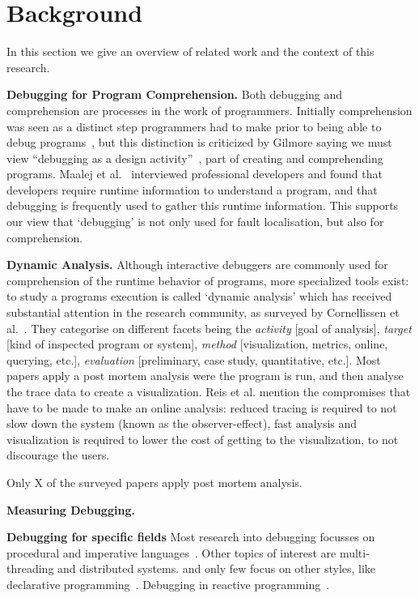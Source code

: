 \section{Background}
In this section we give an overview of related work 
and the context of this research.

\textbf{Debugging for Program Comprehension.}
Both debugging and comprehension are processes in the work of programmers.
Initially comprehension was seen as a distinct step programmers had to make
prior to being able to debug programs~\cite{katz1987debugging}, 
but this distinction is criticized by Gilmore saying we must view 
``debugging as a design activity''~\cite{gilmore1991models}, 
part of creating and comprehending programs. 
Maalej et al.~\cite{Maalej2014} interviewed professional developers 
and found that developers require runtime information to understand a program,
and that debugging is frequently used to gather this runtime information.
This supports our view that `debugging' is not only used for fault localisation,
but also for comprehension.

\textbf{Dynamic Analysis.}
Although interactive debuggers are commonly used for comprehension 
of the runtime behavior of programs, more specialized tools exist: 
to study a programs execution is called `dynamic analysis' which has 
received substantial attention in the research community,
as surveyed by Cornellissen et al.~\cite{cornelissen2009systematic}.
They categorise on different facets being the 
\textit{activity} [goal of analysis],
\textit{target} [kind of inspected program or system],
\textit{method} [visualization, metrics, online, querying, etc.],
\textit{evaluation} [preliminary, case study, quantitative, etc.].
Most papers apply a post mortem analysis were the program is run,
and then analyse the trace data to create a visualization. 
Reis et al. mention the compromises
that have to be made to make an online analysis: 
reduced tracing is required to not slow down the 
system (known as the observer-effect), fast analysis 
and visualization is required to lower the cost of getting 
to the visualization, to not discourage the users.

Only X of the surveyed papers apply post mortem analysis.

\textbf{Measuring Debugging.}

\textbf{Debugging for specific fields}
Most research into debugging focusses on procedural and 
imperative languages~\cite{cornelissen2009systematic}.
Other topics of interest are multi-threading and distributed systems.
and only few focus on other styles, like 
declarative programming~\cite{nilsson1998declarative}.
Debugging in reactive programming~\cite{
	salvaneschi2014empirical,salvaneschi2016debugging}.
